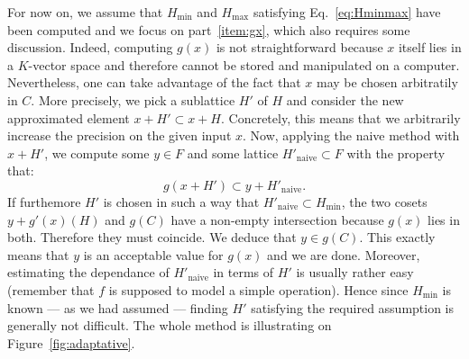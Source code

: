 \documentclass{article}
\begin{document}
For now on, we assume that $H_\min$ and $H_\max$ satisfying 
Eq.~\eqref{eq:Hminmax} have been computed and we focus on 
part~\eqref{item:gx}, which also requires some discussion. Indeed, 
computing $g(x)$ is not straightforward because $x$ itself lies in a 
$K$-vector space and therefore cannot be stored and manipulated on a 
computer. Nevertheless, one can take advantage of the fact that $x$ may 
be chosen arbitratily in $C$. More precisely, we pick a sublattice $H'$ 
of $H$ and consider the new approximated element $x+H' \subset x+H$. 
Concretely, this means that we arbitrarily increase the precision on the 
given input $x$. Now, applying the naive method with $x+H'$, we compute 
some $y \in F$ and some lattice $H'_{\text{naive}} \subset F$ with the 
property that:
$$g(x+H') \subset y + H'_{\text{naive}}.$$
If furthemore $H'$ is chosen in such a way that $H'_{\text{naive}} 
\subset H_\min$, the two cosets $y + g'(x)(H)$ and $g(C)$ have a 
non-empty intersection because $g(x)$ lies in both. Therefore they 
must coincide. We deduce that $y \in g(C)$. This exactly means that
$y$ is an acceptable value for $g(x)$ and we are done.
Moreover, estimating the dependance of $H'_{\text{naive}}$ in terms 
of $H'$ is usually rather easy (remember that $f$ is supposed to model
a simple operation). Hence since $H_\min$ is known --- as
we had assumed --- finding $H'$ satisfying the required assumption is
generally not difficult. 
The whole method is illustrating on Figure~\ref{fig:adaptative}.
\end{document}
